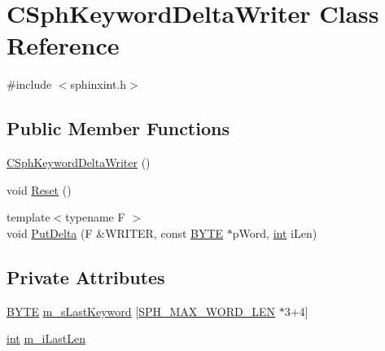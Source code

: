 \hypertarget{classCSphKeywordDeltaWriter}{\section{C\-Sph\-Keyword\-Delta\-Writer Class Reference}
\label{classCSphKeywordDeltaWriter}
}


{\ttfamily \#include $<$sphinxint.\-h$>$}

\subsection*{Public Member Functions}
\begin{DoxyCompactItemize}
\item 
\hyperlink{classCSphKeywordDeltaWriter_a30e14d63151a08e883856d7663214d93}{C\-Sph\-Keyword\-Delta\-Writer} ()
\item 
void \hyperlink{classCSphKeywordDeltaWriter_a07c3acc4a367609dbbb9889723179dfc}{Reset} ()
\item 
{\footnotesize template$<$typename F $>$ }\\void \hyperlink{classCSphKeywordDeltaWriter_adab5b1e3b720f3e0e900c0bf18130612}{Put\-Delta} (F \&W\-R\-I\-T\-E\-R, const \hyperlink{sphinxstd_8h_a4ae1dab0fb4b072a66584546209e7d58}{B\-Y\-T\-E} $\ast$p\-Word, \hyperlink{sphinxexpr_8cpp_a4a26e8f9cb8b736e0c4cbf4d16de985e}{int} i\-Len)
\end{DoxyCompactItemize}
\subsection*{Private Attributes}
\begin{DoxyCompactItemize}
\item 
\hyperlink{sphinxstd_8h_a4ae1dab0fb4b072a66584546209e7d58}{B\-Y\-T\-E} \hyperlink{classCSphKeywordDeltaWriter_a0c4213cdcea8b0daa94c729be7d8a307}{m\-\_\-s\-Last\-Keyword} \mbox{[}\hyperlink{sphinx_8h_ab0f6d383751adea7c80ed4ff4c36532c}{S\-P\-H\-\_\-\-M\-A\-X\-\_\-\-W\-O\-R\-D\-\_\-\-L\-E\-N} $\ast$3+4\mbox{]}
\item 
\hyperlink{sphinxexpr_8cpp_a4a26e8f9cb8b736e0c4cbf4d16de985e}{int} \hyperlink{classCSphKeywordDeltaWriter_a65949219fcc8cd5e26e177bb1ef2ea7c}{m\-\_\-i\-Last\-Len}
\end{DoxyCompactItemize}


